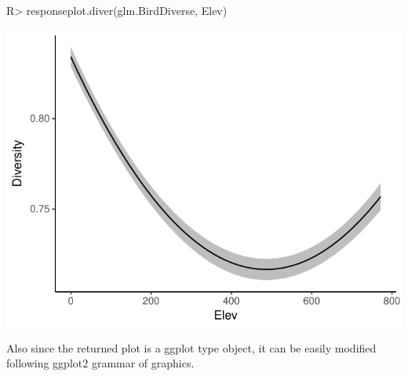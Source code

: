 \documentclass[article]{jss}
\begin{document}
\begin{CodeChunk}

\begin{CodeInput}
R> responseplot.diver(glm.BirdDiverse, Elev)
\end{CodeInput}


\begin{center}\includegraphics{diversityocc_files/figure-latex/unnamed-chunk-25-1} \end{center}

\end{CodeChunk}

Also since the returned plot is a ggplot type object, it can be easily
modified following ggplot2 grammar of graphics.
\end{document}
